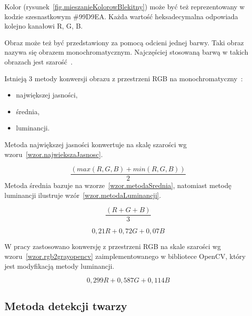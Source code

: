\documentclass[a4paper,twoside,12pt]{book}
\begin{document}
    Kolor (rysunek~\ref{fig.mieszanieKolorowBlekitny}) może być też reprezentowany w kodzie szesnastkowym \#99D9EA.
    Każda
    wartość heksadecymalna odpowiada kolejno kanałowi R, G, B.

    Obraz może też być przedstawiony za pomocą odcieni jednej barwy.
    Taki obraz nazywa się obrazem monochromatycznym.
    Najczęściej stosowaną barwą w takich obrazach jest szarość~\cite{przestrzenieKolorow}.

    Istnieją 3 metody konwersji obrazu z przestrzeni RGB na monochromatyczny~\cite{colorMixing}:
    \begin{itemize}
        \item największej jasności,
        \item średnia,
        \item luminancji.
    \end{itemize}
    Metoda największej jasności konwertuje na skalę szarości wg wzoru~\ref{wzor.najwiekszaJasnosc}.

    \large
    \begin{equation}
        \frac{(max(R, G, B) + min(R, G, B))}{2}
        \label{wzor.najwiekszaJasnosc}
    \end{equation}
    \normalsize
    Metoda średnia bazuje na wzorze~\ref{wzor.metodaSrednia}, natomiast metodę luminancji ilustruje wzór~\ref{wzor.metodaLuminancji}.

    \large
    \begin{equation}
        \frac{(R + G + B)}{3}
        \label{wzor.metodaSrednia}
    \end{equation}
    \normalsize

    \large
    \begin{equation}
        0,21 R + 0,72 G + 0,07 B
        \label{wzor.metodaLuminancji}
    \end{equation}
    \normalsize

    W pracy zastosowano konwersję z przestrzeni RGB na skale szarości wg wzoru~\ref{wzor.rgb2grayopencv}
    zaimplementowanego w bibliotece OpenCV, który jest modyfikacją metody luminancji.

    \large
    \begin{equation}
        0,299 R + 0,587 G + 0,114 B
        \label{wzor.rgb2grayopencv}
    \end{equation}
    \normalsize

    \subsection{Metoda detekcji twarzy}\label{subsec:algorytm-haar-cascade}
\end{document}
